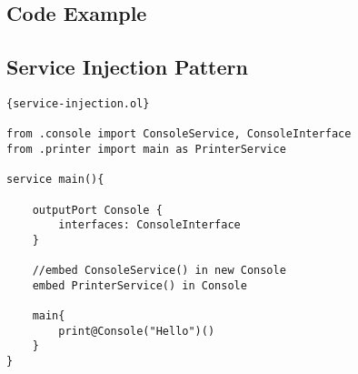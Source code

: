 
\subsection{Code Example}


\subsection{Service Injection Pattern}


\begin{listing}
    \lstset{language=Jolie,
        style=codeStyle,
        numbers=left,
        firstnumber=1
    }
    \begin{lstlisting}[frame=tlrb,
basicstyle=\footnotesize]{service-injection.ol}

from .console import ConsoleService, ConsoleInterface
from .printer import main as PrinterService

service main(){

    outputPort Console {
        interfaces: ConsoleInterface
    }

    //embed ConsoleService() in new Console
    embed PrinterService() in Console

    main{
        print@Console("Hello")()
    }
}
\end{lstlisting}

\end{listing}
